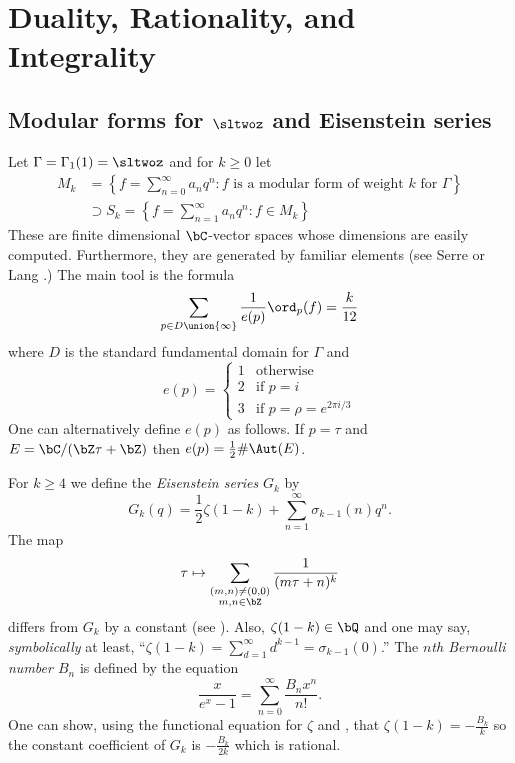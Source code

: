 \documentclass{report}
\begin{document}

\chapter{Duality, Rationality, and Integrality}

\section{Modular forms for $\sltwoz$ and Eisenstein series}\label{sec:sl2eis}
Let $\Gamma=\Gamma_1(1)=\sltwoz$ and for $k\geq 0$
let
\begin{align*}
M_k&=\left\{f=\sum_{n=0}^{\infty}a_n q^n : \text{$f$ is a modular form
of weight $k$ for $\Gamma$}\right\}\\
&\supset S_k=\left\{f=\sum_{n=1}^{\infty}a_n q^n : f \in M_k\right\}\end{align*}
These are finite dimensional $\bC$-vector spaces whose dimensions
are easily computed. Furthermore, they are generated by familiar elements
(see Serre \cite{serre:arithmetic} or Lang \cite{lang:modular}.)
The main tool is the formula
$$\sum_{p\in D\union\{\infty\}} \frac{1}{e(p)}\ord_p(f) = \frac{k}{12}$$
where $D$ is the standard fundamental domain for $\Gamma$ and
$$e(p)=\begin{cases} 1&\text{otherwise}\\
                     2&\text{if $p=i$}\\
                     3&\text{if $p=\rho=e^{2\pi i/3}$}
      \end{cases}$$
One can alternatively define $e(p)$
as follows. If $p=\tau$ and $E=\bC/(\bZ\tau+\bZ)$
then $e(p)=\frac{1}{2}\#\Aut(E)$.

For $k\geq 4$ we define the {\em Eisenstein series} $G_k$ by
$$G_k(q)=\frac{1}{2}\zeta(1-k)+\sum_{n=1}^{\infty}\sigma_{k-1}(n)q^n.$$
The map
$$\tau\mapsto\sum_{\substack{(m,n)\neq(0,0)\\m,n\in\bZ}}
\frac{1}{(m\tau+n)^k}$$
differs from $G_k$ by a constant (see \cite[\S{}VII.4.2]{serre:arithmetic}).
Also, $\zeta(1-k)\in\bQ$ and one may say, {\em symbolically} at least,
``$\displaystyle \zeta(1-k)=\sum_{d=1}^{\infty} d^{k-1} =
\sigma_{k-1}(0)$.''
The {\em $n$th Bernoulli number $B_n$} is defined by the equation
$$\frac{x}{e^x-1}=\sum_{n=0}^{\infty} \frac{B_nx^n}{n!}.$$
One can show, using the functional equation for $\zeta$ and
\cite[\S{}VII.4.1]{serre:arithmetic}, that $\zeta(1-k)=-\frac{B_k}{k}$ so
the constant coefficient of $G_k$ is $-\frac{B_k}{2k}$ which is
rational.
\end{document}
